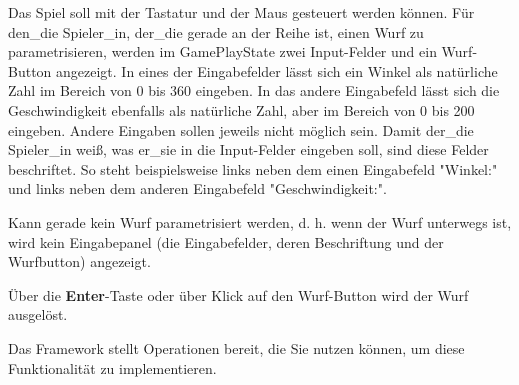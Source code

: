 Das Spiel soll mit der Tastatur und der Maus gesteuert werden k\"onnen. Für den\_die Spieler\_in, der\_die gerade an der Reihe ist,
einen Wurf zu parametrisieren, werden im GamePlayState zwei Input-Felder und ein Wurf-Button angezeigt. In eines der Eingabefelder
lässt sich ein Winkel als natürliche Zahl im Bereich von 0 bis 360 eingeben. In das andere Eingabefeld lässt sich die Geschwindigkeit ebenfalls als 
natürliche Zahl, aber im Bereich von 0 bis 200 eingeben. Andere Eingaben sollen jeweils nicht möglich sein. Damit der\_die Spieler\_in weiß, was er\_sie
in die Input-Felder eingeben soll, sind diese Felder beschriftet. So steht beispielsweise links neben dem einen Eingabefeld "Winkel:" und
links neben dem anderen Eingabefeld "Geschwindigkeit:".

Kann gerade kein Wurf parametrisiert werden, d. h. wenn der Wurf 
unterwegs ist, wird kein Eingabepanel (die Eingabefelder, deren Beschriftung und der Wurfbutton) angezeigt. 

Über die \textbf{Enter}-Taste oder über Klick auf den Wurf-Button wird der Wurf ausgelöst.

Das Framework stellt Operationen bereit, die Sie nutzen k\"onnen, um diese Funktionalit\"at zu implementieren.
